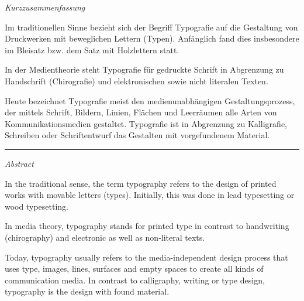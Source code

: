 \clearpage
{\normalfont
\color{uniblau}
\huge\sffamily\itshape
Kurzzusammenfassung
}

Im traditionellen Sinne bezieht sich der Begriff Typografie auf die Gestaltung von Druckwerken mit beweglichen Lettern (Typen). Anfänglich fand dies insbesondere im Bleisatz bzw. dem Satz mit Holzlettern statt.

In der Medientheorie steht Typografie für gedruckte Schrift in Abgrenzung zu Handschrift (Chirografie) und elektronischen sowie nicht literalen Texten.

Heute bezeichnet Typografie meist den medienunabhängigen Gestaltungsprozess, der mittels Schrift, Bildern, Linien, Flächen und Leerräumen alle Arten von Kommunikationsmedien gestaltet. Typografie ist in Abgrenzung zu Kalligrafie, Schreiben oder Schriftentwurf das Gestalten mit vorgefundenem Material.

\vfill

\rule{\textwidth}{0.4pt}

\vspace{1cm}

{\normalfont
\color{uniblau}
\huge\sffamily\itshape
Abstract
}

In the traditional sense, the term typography refers to the design of printed works with movable letters (types). Initially, this was done in lead typesetting or wood typesetting.

In media theory, typography stands for printed type in contrast to handwriting (chirography) and electronic as well as non-literal texts.

Today, typography usually refers to the media-independent design process that uses type, images, lines, surfaces and empty spaces to create all kinds of communication media. In contrast to calligraphy, writing or type design, typography is the design with found material.


\vfill